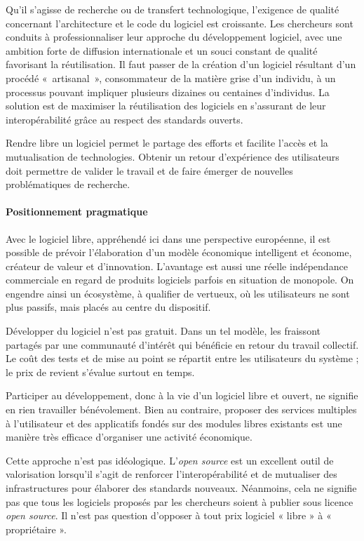 Qu'il s'agisse de recherche ou de transfert technologique, l'exigence de qualité concernant l'architecture et le code du logiciel est croissante. Les chercheurs sont conduits à professionnaliser leur approche du développement logiciel, avec une ambition forte de diffusion internationale et un souci constant de qualité favorisant la réutilisation.
Il faut passer de la création d'un logiciel résultant d'un procédé «~artisanal~», consommateur de la matière grise d'un individu, à un processus pouvant impliquer plusieurs dizaines ou centaines d'individus. La solution est de maximiser la réutilisation des logiciels en s'assurant de leur interopérabilité grâce au respect des standards ouverts.

Rendre libre un logiciel permet le partage des efforts et facilite l'accès et la mutualisation de technologies. Obtenir un retour d'expérience des utilisateurs doit permettre de valider le travail et de faire émerger de nouvelles problématiques de recherche.

\paragraph{Positionnement pragmatique}

%
Avec le logiciel libre, appréhendé ici dans une perspective européenne, il est possible de prévoir l'élaboration d'un modèle économique intelligent et économe, créateur de valeur et d'innovation. L'avantage est aussi une réelle indépendance commerciale en regard de produits logiciels parfois en situation de monopole. On engendre ainsi un écosystème, à qualifier de vertueux, où les utilisateurs ne sont plus passifs, mais placés au centre du dispositif. 

Développer du logiciel n'est pas gratuit. Dans un tel modèle, les frais\linebreak sont partagés par une communauté d'intérêt qui bénéficie en retour du travail collectif. Le coût des tests et de mise au point se répartit entre les utilisateurs du système ; le prix de revient s'évalue surtout en temps. 

Participer au développement, donc à la vie d'un logiciel libre et ouvert, ne signifie en rien travailler bénévolement. Bien au contraire, proposer des services multiples à l'utilisateur et des applicatifs fondés sur des modules libres existants est une manière très efficace d'organiser une activité économique.

Cette approche n'est pas idéologique. L'\textit{open source} est un excellent outil de valorisation lorsqu'il s'agit de renforcer l'interopérabilité et de mutualiser des infrastructures pour élaborer des standards nouveaux. Néanmoins, cela ne signifie pas que tous les logiciels proposés par les chercheurs soient à publier sous licence \textit{open source}. Il n'est pas question d'opposer à tout prix logiciel « libre » à « propriétaire ». 


